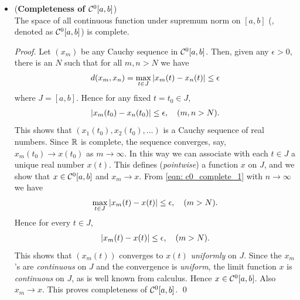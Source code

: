 \documentclass[11pt]{article}
\begin{document}
\begin{itemize}
\item \begin{proposition} (\textbf{Completeness of ${\mathcal C}^{0}[a,b]$})\\
The space of all continuous function under supremum norm on $[a,b]$ (, denoted as ${\mathcal C}^{0}[a,b]$) is complete.
\end{proposition}
\begin{proof}
Let $(x_m)$ be any Cauchy sequence in ${\mathcal C}^{0}[a, b]$. Then, given any $\epsilon > 0$, there is an $N$ such that for all $m, n> N$ we have
\begin{align}
d(x_m, x_n) = \max_{t \in J}\left\lvert x_m(t)  - x_n(t)  \right\rvert \le \epsilon  \label{eqn: c0_complete_1}
\end{align}
where $J = [a, b]$. Hence for any fixed $t = t_0 \in J$,
\begin{align*}
\left\lvert x_m(t_0)  - x_n(t_0)  \right\rvert \le \epsilon, \quad (m,n>N).
\end{align*} This shows that $(x_1(t_0), x_2(t_0), \ldots)$ is a Cauchy sequence of real numbers. Since ${\mathbb R}$ is complete, the sequence converges, say,
$x_m(t_0) \rightarrow x(t_0)$ as $m \rightarrow \infty$. In this way we can associate with each $t \in J$ a unique real number $x(t)$. This defines (\emph{pointwise}) a function $x$ on $J$, and we show that $x \in {\mathcal C}^{0}[a, b]$ and $x_m \rightarrow x$. From \eqref{eqn: c0_complete_1} with $n \rightarrow \infty$ we have
\begin{align*}
\max_{t \in J}\left\lvert x_m(t)  - x(t)  \right\rvert \le \epsilon, \quad (m>N).
\end{align*} Hence for every $t \in J$,
\begin{align*}
\left\lvert x_m(t)  - x(t)  \right\rvert \le \epsilon, \quad (m>N).
\end{align*} This shows that $(x_m(t))$ converges to $x(t)$ \emph{uniformly} on $J$. Since the $x_m$'s are \emph{continuous} on $J$ and the convergence is \emph{uniform}, the limit function $x$ is \emph{continuous} on $J$, as is well known from calculus. Hence $x \in {\mathcal C}^{0}[a, b]$. Also $x_m \rightarrow x$. This proves completeness of ${\mathcal C}^{0}[a, b]$. \qed
\end{proof}


\end{itemize}
\end{document}

